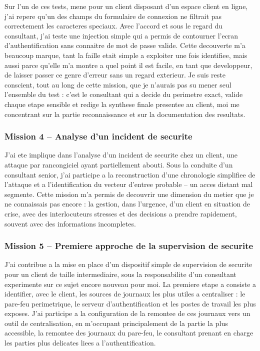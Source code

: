 \documentclass[11pt,a4paper]{article}
\begin{document}
Sur l'un de ces tests, mene pour un client disposant d'un espace client en ligne, j'ai repere qu'un des champs du formulaire de connexion ne filtrait pas correctement les caracteres speciaux. Avec l'accord et sous le regard du consultant, j'ai teste une injection simple qui a permis de contourner l'ecran d'authentification sans connaitre de mot de passe valide. Cette decouverte m'a beaucoup marque, tant la faille etait simple a exploiter une fois identifiee, mais aussi parce qu'elle m'a montre a quel point il est facile, en tant que developpeur, de laisser passer ce genre d'erreur sans un regard exterieur. Je suis reste conscient, tout au long de cette mission, que je n'aurais pas su mener seul l'ensemble du test : c'est le consultant qui a decide du perimetre exact, valide chaque etape sensible et redige la synthese finale presentee au client, moi me concentrant sur la partie reconnaissance et sur la documentation des resultats.

\subsubsection*{Mission 4 -- Analyse d'un incident de securite}

J'ai ete implique dans l'analyse d'un incident de securite chez un client, une attaque par rancongiciel ayant partiellement abouti. Sous la conduite d'un consultant senior, j'ai participe a la reconstruction d'une chronologie simplifiee de l'attaque et a l'identification du vecteur d'entree probable -- un acces distant mal segmente. Cette mission m'a permis de decouvrir une dimension du metier que je ne connaissais pas encore : la gestion, dans l'urgence, d'un client en situation de crise, avec des interlocuteurs stresses et des decisions a prendre rapidement, souvent avec des informations incompletes.

\subsubsection*{Mission 5 -- Premiere approche de la supervision de securite}

J'ai contribue a la mise en place d'un dispositif simple de supervision de securite pour un client de taille intermediaire, sous la responsabilite d'un consultant experimente sur ce sujet encore nouveau pour moi. La premiere etape a consiste a identifier, avec le client, les sources de journaux les plus utiles a centraliser : le pare-feu perimetrique, le serveur d'authentification et les postes de travail les plus exposes. J'ai participe a la configuration de la remontee de ces journaux vers un outil de centralisation, en m'occupant principalement de la partie la plus accessible, la remontee des journaux du pare-feu, le consultant prenant en charge les parties plus delicates liees a l'authentification.
\end{document}
